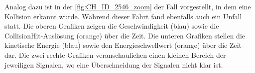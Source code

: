 Analog dazu ist in der \autoref{fig:CH_ID_2546_zoom} der Fall vorgestellt, in dem eine Kollision erkannt wurde. Während dieser Fahrt fand ebenfalls auch ein Unfall statt. 
Die oberen Grafiken zeigen die Geschwindigkeit (blau) sowie die CollisionHit-Auslösung (orange) über die Zeit.
Die unteren Grafiken stellen die kinetische Energie (blau) sowie den Energieschwellwert (orange) über die Zeit dar.
Die zwei rechte Grafiken veranschaulichen einen kleinen Bereich der jeweiligen Signalen, wo eine Überschneidung der Signalen nicht klar ist.




